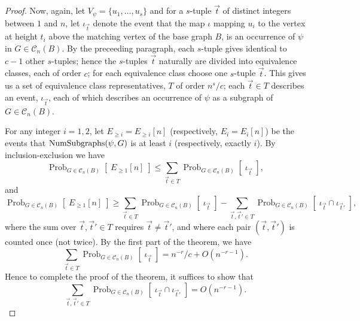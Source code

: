 \documentclass{memo-l}
\theoremstyle{plain}
\theoremstyle{definition}
\numberwithin{section}{chapter}
\numberwithin{equation}{chapter}
\newcommand{\prob}[2]{{\Prob}_{#1}{\left[\; #2\; \right]}}
\DeclareMathOperator{\Prob}{Prob}
\theoremstyle{plain}
\theoremstyle{definition}
\newcommand\cC{\mathcal{C}}
\begin{document}
\begin{proof}
Now, again, 
let \( V_\psi =
\{ u_1, \ldots, u_s \} \) and for a $s$-tuple \( \vec t \) of distinct integers
between \(1\) and \(n\), let \( \iota_{\vec t} \) denote the event that the
map \( \iota \) mapping \( u_i \) to the vertex at height \( t_i \) above
the matching vertex of the base graph \(B\), is an occurrence of \( \psi \)
in \( G \in \cC_n(B) \).
By the preceeding paragraph, each $s$-tuple gives identical
to $c-1$
other $s$-tuples; hence the $s$-tuples $\vec t$ naturally are divided
into equivalence classes, each of order $c$; for each equivalence class
choose one $s$-tuple $\vec t$.  This gives us a set of equivalence class
representatives, $T$ of order $n^s/c$; each $\vec t\in T$ describes an
event, $\iota_{\vec t}$, each of which describes an occurrence of
$\psi$ as a subgraph of $G\in\cC_n(B)$.

For any integer $i=1,2$, let $E_{\ge i}=E_{\ge i}[n]$ 
(respectively, $E_i=E_i[n]$) be the events that ${\rm NumSubgraphs}(\psi,G)$
is at least $i$ 
(respectively, exactly $i$).  By inclusion-exclusion we have
$$
\prob{G\in\cC_n(B)}{E_{\ge 1}[n]} \le \sum_{\vec t\in T}
\prob{G\in\cC_n(B)}{\iota_{\vec t}} ,
$$
and 
$$
\prob{G\in\cC_n(B)}{E_{\ge 1}[n]} \ge \sum_{\vec t\in T}
\prob{G\in\cC_n(B)}{\iota_{\vec t}} - 
\sum_{\vec t,\vec t'\in T}
\prob{G\in\cC_n(B)}{\iota_{\vec t}\cap \iota_{\vec t'}} ,
$$
where 
the sum over $\vec t,\vec t'\in T$ requires $\vec t\ne\vec t'$, and where
each pair $(\vec t,\vec t')$ is counted once (not twice).
By the first part of the theorem, we have
$$
\sum_{\vec t\in T}
\prob{G\in\cC_n(B)}{\iota_{\vec t}} 
= n^{-r}/c + O(n^{-r-1}).
$$
Hence to complete the proof of the theorem, it suffices to show
that 
\begin{equation}\label{eq:needed_vec_t}
\sum_{\vec t,\vec t'\in T}
\prob{G\in\cC_n(B)}{\iota_{\vec t}\cap \iota_{\vec t'}} 
= O(n^{-r-1}).
\end{equation}


\end{proof}
\end{document}
